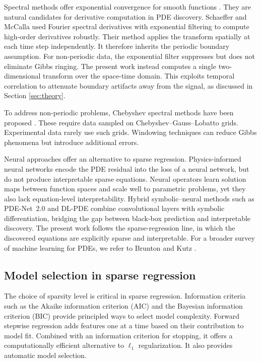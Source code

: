 \documentclass[preprint,12pt]{elsarticle}
\begin{document}
Spectral methods offer exponential convergence for smooth functions \cite{canuto2006spectral}. They are natural candidates for derivative computation in PDE discovery. Schaeffer and McCalla \cite{schaeffer2017learning} used Fourier spectral derivatives with exponential filtering to compute high-order derivatives robustly. Their method applies the transform spatially at each time step independently. It therefore inherits the periodic boundary assumption. For non-periodic data, the exponential filter suppresses but does not eliminate Gibbs ringing. The present work instead computes a single two-dimensional transform over the space-time domain. This exploits temporal correlation to attenuate boundary artifacts away from the signal, as discussed in Section \ref{sec:theory}.

To address non-periodic problems, Chebyshev spectral methods have been proposed \cite{kopriva2009implementing}. These require data sampled on Chebyshev--Gauss--Lobatto grids. Experimental data rarely use such grids. Windowing techniques can reduce Gibbs phenomena but introduce additional errors.

Neural approaches offer an alternative to sparse regression. Physics-informed neural networks \cite{raissi2019physics} encode the PDE residual into the loss of a neural network, but do not produce interpretable sparse equations. Neural operators \cite{li2021fourier} learn solution maps between function spaces and scale well to parametric problems, yet they also lack equation-level interpretability. Hybrid symbolic--neural methods such as PDE-Net~2.0 \cite{long2019pde} and DL-PDE \cite{xu2020dlpde} combine convolutional layers with symbolic differentiation, bridging the gap between black-box prediction and interpretable discovery. The present work follows the sparse-regression line, in which the discovered equations are explicitly sparse and interpretable. For a broader survey of machine learning for PDEs, we refer to Brunton and Kutz \cite{brunton2023machine}.

\subsection{Model selection in sparse regression}

The choice of sparsity level is critical in sparse regression. Information criteria such as the Akaike information criterion (AIC) and the Bayesian information criterion (BIC) \cite{schwarz1978estimating} provide principled ways to select model complexity. Forward stepwise regression adds features one at a time based on their contribution to model fit. Combined with an information criterion for stopping, it offers a computationally efficient alternative to $\ell_1$ regularization. It also provides automatic model selection.
\end{document}
